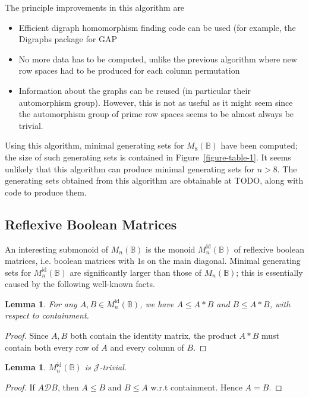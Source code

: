 \documentclass[11pt]{article}
\newtheorem{lemma}[thm]{Lemma}
\numberwithin{equation}{section}
\newcommand{\B}{\mathbb{B}}
\newcommand{\Bn}{M_n(\B)}
\newcommand{\Bm}[1]{M_{#1}(\B)}
\newcommand{\Refn}{M_n^{\text{id}}(\B)}
\newcommand{\D}{\mathscr{D}}
\newcommand{\J}{\mathscr{J}}
\begin{document}
The principle improvements in this algorithm are
\begin{itemize}
  \item 
    Efficient digraph homomorphism finding code can be used (for example, the
    Digraphs package for GAP~\cite{Digraphs2020aa}
  \item
    No more data has to be computed, unlike the previous algorithm where new row
    spaces had to be produced for each column permutation
  \item
    Information about the graphs can be reused (in particular their automorphism
    group). However, this is not as useful as it might seem since the
    automorphism group of prime row spaces seems to be almost always be trivial.
\end{itemize}

Using this algorithm, minimal generating sets for $\Bm{8}$ have been computed;
the size of such generating sets is contained in Figure~\ref{figure-table-1}. It
seems unlikely that this algorithm can produce minimal generating sets for $n >
8$. The generating sets obtained from this algorithm are obtainable at TODO,
along with code to produce them.

\subsection{Reflexive Boolean Matrices}
An interesting submonoid of $\Bn$ is the monoid $\Refn$ of reflexive boolean
matrices, i.e. boolean matrices with $1$s on the main diagonal. Minimal
generating sets for $\Refn$ are significantly larger than those of $\Bn$; this
is essentially caused by the following well-known facts.

\begin{lemma}
  For any $A, B \in \Refn$, we have $A \leq A * B$ and $B \leq A * B$, with
  respect to containment.
\end{lemma}
\begin{proof}
  Since $A, B$ both contain the identity matrix, the product $A * B$ must
  contain both every row of $A$ and every column of $B$.
\end{proof}

\begin{lemma}
  $\Refn$ is $\J$-trivial. 
\end{lemma}
\begin{proof}
  If $A \D B$, then $A \leq B$ and $B \leq A$ w.r.t containment. Hence $A = B$.    
\end{proof}
\end{document}
